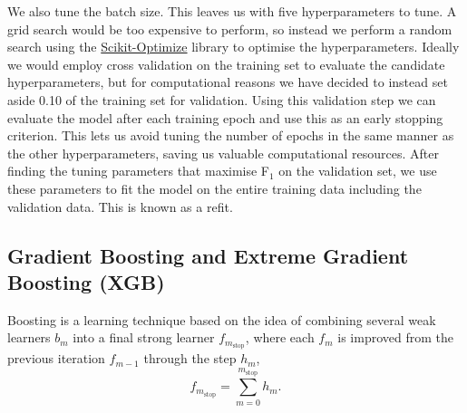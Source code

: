 \documentclass[a4paper, 11pt, twocolumn]{article}
\begin{document}
We also tune the batch size. This leaves us with five hyperparameters to tune. A 
grid search would be too expensive to perform, so instead we perform a random
search using the \href{https://scikit-optimize.github.io/}{Scikit-Optimize} 
library to optimise the hyperparameters.
Ideally we would employ cross validation on the training set to evaluate the 
candidate hyperparameters, but for computational reasons we have decided to 
instead set aside 0.10 of the training set for validation. Using this validation 
step we can evaluate the model after each training epoch and use this as an early 
stopping criterion. This lets us avoid tuning the number of epochs in the same 
manner as the other hyperparameters, saving us valuable computational resources. 
After finding the tuning parameters that maximise F$_1$ on the validation set, we 
use these parameters to fit the model on the entire training data including the 
validation data. This is known as a refit. 


\subsection{Gradient Boosting and Extreme Gradient Boosting (XGB)}
Boosting is a learning technique based on the idea of combining several weak
learners $b_m$ into a final strong learner $f_{m_\text{stop}}$, where each
$f_m$ is improved from the previous iteration $f_{m-1}$ through the step $h_m$, 
\begin{equation}
      f_{m_\text{stop}} = \sum_{m=0}^{m_\text{stop}} h_m.
\end{equation}
\end{document}
